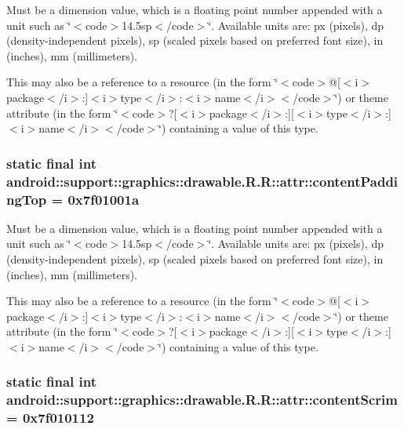 Must be a dimension value, which is a floating point number appended with a unit such as \char`\"{}$<$code$>$14.5sp$<$/code$>$\char`\"{}. Available units are: px (pixels), dp (density-independent pixels), sp (scaled pixels based on preferred font size), in (inches), mm (millimeters). 

This may also be a reference to a resource (in the form \char`\"{}$<$code$>$@\mbox{[}$<$i$>$package$<$/i$>$:\mbox{]}$<$i$>$type$<$/i$>$:$<$i$>$name$<$/i$>$$<$/code$>$\char`\"{}) or theme attribute (in the form \char`\"{}$<$code$>$?\mbox{[}$<$i$>$package$<$/i$>$:\mbox{]}\mbox{[}$<$i$>$type$<$/i$>$:\mbox{]}$<$i$>$name$<$/i$>$$<$/code$>$\char`\"{}) containing a value of this type. \hypertarget{classandroid_1_1support_1_1graphics_1_1drawable_1_1_r_1_1attr_46879428b18a86e50cf865d6b5203a93}{
\subsubsection[{contentPaddingTop}]{\setlength{\rightskip}{0pt plus 5cm}static final int android::support::graphics::drawable.R.R::attr::contentPaddingTop = 0x7f01001a}}
\label{classandroid_1_1support_1_1graphics_1_1drawable_1_1_r_1_1attr_46879428b18a86e50cf865d6b5203a93}


Must be a dimension value, which is a floating point number appended with a unit such as \char`\"{}$<$code$>$14.5sp$<$/code$>$\char`\"{}. Available units are: px (pixels), dp (density-independent pixels), sp (scaled pixels based on preferred font size), in (inches), mm (millimeters). 

This may also be a reference to a resource (in the form \char`\"{}$<$code$>$@\mbox{[}$<$i$>$package$<$/i$>$:\mbox{]}$<$i$>$type$<$/i$>$:$<$i$>$name$<$/i$>$$<$/code$>$\char`\"{}) or theme attribute (in the form \char`\"{}$<$code$>$?\mbox{[}$<$i$>$package$<$/i$>$:\mbox{]}\mbox{[}$<$i$>$type$<$/i$>$:\mbox{]}$<$i$>$name$<$/i$>$$<$/code$>$\char`\"{}) containing a value of this type. \hypertarget{classandroid_1_1support_1_1graphics_1_1drawable_1_1_r_1_1attr_9e189d4e34496664687be9cf0672720f}{
\subsubsection[{contentScrim}]{\setlength{\rightskip}{0pt plus 5cm}static final int android::support::graphics::drawable.R.R::attr::contentScrim = 0x7f010112}}
\label{classandroid_1_1support_1_1graphics_1_1drawable_1_1_r_1_1attr_9e189d4e34496664687be9cf0672720f}


